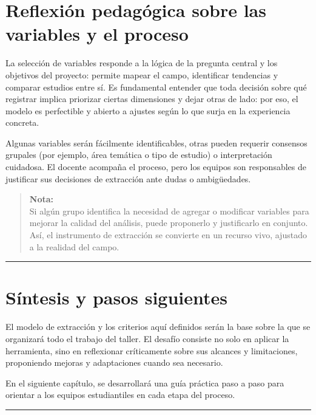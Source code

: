 \documentclass[
  letterpaper,
]{book}
\begin{document}
\section{Reflexión pedagógica sobre las variables y el
proceso}\label{reflexiuxf3n-pedaguxf3gica-sobre-las-variables-y-el-proceso}

La selección de variables responde a la lógica de la pregunta central y
los objetivos del proyecto: permite mapear el campo, identificar
tendencias y comparar estudios entre sí. Es fundamental entender que
toda decisión sobre qué registrar implica priorizar ciertas dimensiones
y dejar otras de lado: por eso, el modelo es perfectible y abierto a
ajustes según lo que surja en la experiencia concreta.

Algunas variables serán fácilmente identificables, otras pueden requerir
consensos grupales (por ejemplo, área temática o tipo de estudio) o
interpretación cuidadosa. El docente acompaña el proceso, pero los
equipos son responsables de justificar sus decisiones de extracción ante
dudas o ambigüedades.

\begin{quote}
\textbf{Nota:}\\
Si algún grupo identifica la necesidad de agregar o modificar variables
para mejorar la calidad del análisis, puede proponerlo y justificarlo en
conjunto. Así, el instrumento de extracción se convierte en un recurso
vivo, ajustado a la realidad del campo.
\end{quote}

\begin{center}\rule{0.5\linewidth}{0.5pt}\end{center}

\section{Síntesis y pasos
siguientes}\label{suxedntesis-y-pasos-siguientes}

El modelo de extracción y los criterios aquí definidos serán la base
sobre la que se organizará todo el trabajo del taller. El desafío
consiste no solo en aplicar la herramienta, sino en reflexionar
críticamente sobre sus alcances y limitaciones, proponiendo mejoras y
adaptaciones cuando sea necesario.

En el siguiente capítulo, se desarrollará una guía práctica paso a paso
para orientar a los equipos estudiantiles en cada etapa del proceso.

\begin{center}\rule{0.5\linewidth}{0.5pt}\end{center}
\end{document}
